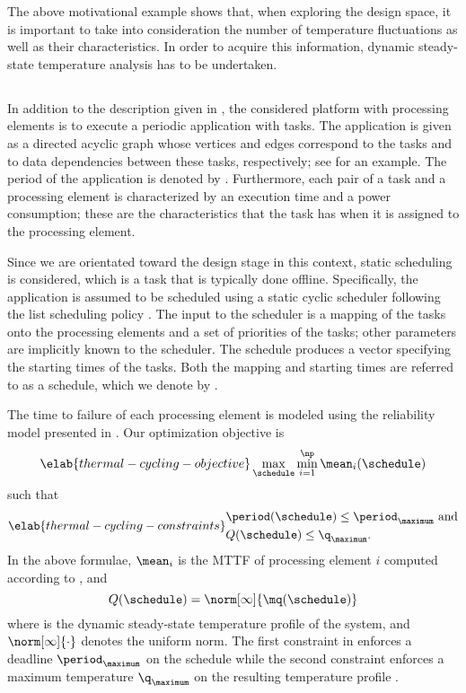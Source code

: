 The above motivational example shows that, when exploring the design space, it
is important to take into consideration the number of temperature fluctuations
as well as their characteristics. In order to acquire this information, dynamic
steady-state temperature analysis has to be undertaken.

\subsection{\problemtitle}

In addition to the description given in , the considered
platform with \np processing elements is to execute a periodic application with
\nt tasks. The application is given as a directed acyclic graph whose vertices
and edges correspond to the tasks and to data dependencies between these tasks,
respectively; see  for an example. The period
of the application is denoted by \period. Furthermore, each pair of a task and a
processing element is characterized by an execution time and a power
consumption; these are the characteristics that the task has when it is assigned
to the processing element.

Since we are orientated toward the design stage in this context, static
scheduling is considered, which is a task that is typically done offline.
Specifically, the application is assumed to be scheduled using a static cyclic
scheduler following the list scheduling policy \cite{adam1974}. The input to the
scheduler is a mapping of the tasks onto the processing elements and a set of
priorities of the tasks; other parameters are implicitly known to the scheduler.
The schedule produces a vector specifying the starting times of the tasks. Both
the mapping and starting times are referred to as a schedule, which we denote by
\schedule.

The time to failure of each processing element is modeled using the reliability
model presented in . Our optimization objective is
\begin{equation} \elab{thermal-cycling-objective}
  \max_{\schedule} \min_{i = 1}^\np \mean_i(\schedule)
\end{equation}
such that
\begin{align} \elab{thermal-cycling-constraints}
  \begin{split}
    & \period(\schedule) \leq \period_\maximum \text{ and} \\
    & Q(\schedule) \leq \q_\maximum.
  \end{split}
\end{align}
In the above formulae, $\mean_i$ is the \ac{MTTF} of processing element $i$
computed according to , and
\[
  Q(\schedule) = \norm[\infty]{\mq(\schedule)}
\]
where \mq is the dynamic steady-state temperature profile of the system, and
$\norm[\infty]{\cdot}$ denotes the uniform norm. The first constraint in
 enforces a deadline $\period_\maximum$ on the
schedule while the second constraint enforces a maximum temperature
$\q_\maximum$ on the resulting temperature profile \mq.

